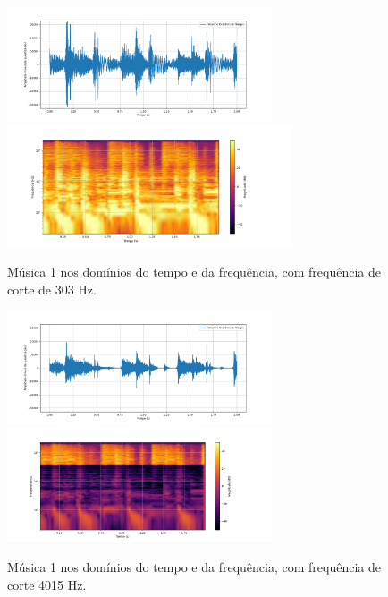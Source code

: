 \begin{figure}[htpb]
    \centering
    \includegraphics[width=0.7\textwidth]{figuras/fig83.png}
    \includegraphics[width=0.75\textwidth]{figuras/fig84.png}
    \caption{Música 1 nos domínios do tempo e da frequência, com frequência de corte de 303 Hz.}
    \label{fig83}
\end{figure}
\begin{figure}[htpb]
    \centering
    \includegraphics[width=0.7\textwidth]{figuras/fig85.png}
    \includegraphics[width=0.7\textwidth]{figuras/fig86.png}
    \caption{Música 1 nos domínios do tempo e da frequência, com frequência de corte 4015 Hz.}
    \label{fig85}
\end{figure}

